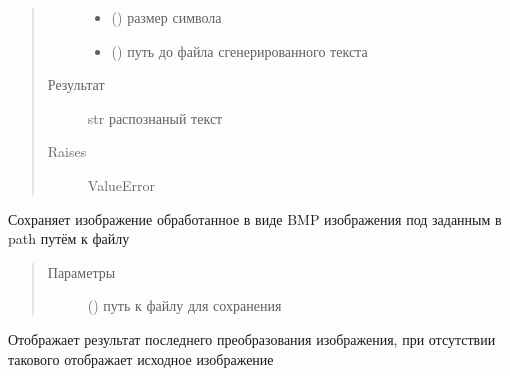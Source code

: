 \documentclass[letterpaper,10pt,russian]{sphinxmanual}
\begin{document}
\begin{fulllineitems}
\begin{fulllineitems}
\begin{quote}
\begin{description}
\begin{itemize}
\item {} 
 () \textendash{} размер символа

\item {} 
 () \textendash{} путь до файла сгенерированного текста

\end{itemize}

\item[{Результат}] \leavevmode
str \textendash{} распознаный текст

\item[{Raises}] \leavevmode
ValueError

\end{description}\end{quote}

\end{fulllineitems}


\begin{fulllineitems}
\label{\detokenize{OCRImage:image.OCRImage.save}}
Сохраняет изображение обработанное в виде BMP изображения под заданным в path путём к файлу
\begin{quote}\begin{description}
\item[{Параметры}] \leavevmode
{} () \textendash{} путь к файлу для сохранения

\end{description}\end{quote}

\end{fulllineitems}


\begin{fulllineitems}
\label{\detokenize{OCRImage:image.OCRImage.show_result}}
Отображает результат последнего преобразования изображения,
при отсутствии такового отображает исходное изображение

\end{fulllineitems}


\end{fulllineitems}
\end{document}
